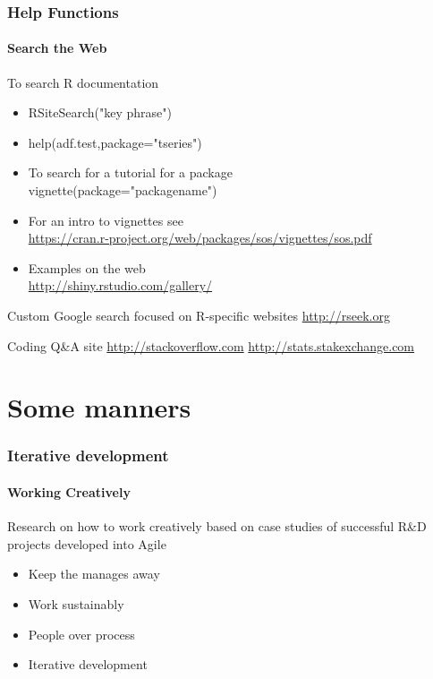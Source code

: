 \documentclass{article}\usepackage[]{graphicx}\usepackage[]{color}
\begin{document}
\begin{frame}
  \frametitle{Help Functions}
  \framesubtitle{Search the Web}
\begin{block}{To search R documentation}
\begin{itemize}
\item RSiteSearch("key phrase")
\item help(adf.test,package="tseries")
\item To search for a tutorial for a package\\
 vignette(package="packagename")
\item For an intro to vignettes see\\
\url{https://cran.r-project.org/web/packages/sos/vignettes/sos.pdf}
\item Examples on the web\\
\url{http://shiny.rstudio.com/gallery/}
\end{itemize}
\end{block}
\begin{block}{Custom Google search focused on R-specific websites}
\url{http://rseek.org}
\end{block}

\begin{block}{Coding Q\&A site}
\url{http://stackoverflow.com}
\url{http://stats.stakexchange.com}
\end{block}

\end{frame}

\section*{Some manners}
\begin{frame}
  \frametitle{Iterative development}
  \framesubtitle{Working Creatively}
Research on how to work creatively based on case studies of  successful R\&D projects developed into Agile
\begin{itemize}
\item Keep the manages away
\item Work sustainably
\item People over process
\item Iterative development
\end{itemize}
\end{frame}
\end{document}
